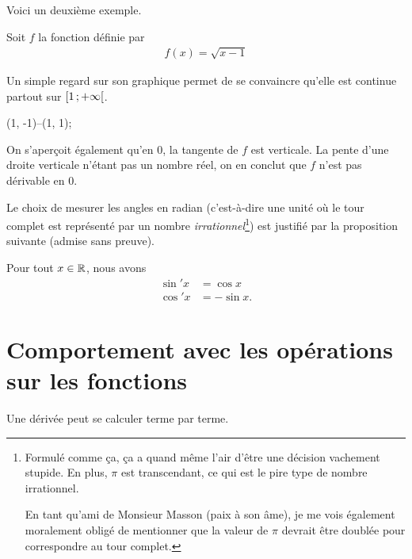 \documentclass[main.tex]{subfiles}
\begin{document}
Voici un deuxième exemple.

\begin{example}
    
    Soit $f$ la fonction définie par 
    \begin{align}
        f(x) = \sqrt {x-1}
    \end{align}
    
    Un simple regard sur son graphique permet de se convaincre qu'elle est continue partout sur $\mathopen{[}1\,;+ \infty\mathclose{[}$.
    \begin{plot}{0.5}{-2}{-2}{6}{4}
        \drawline (1, -1)--(1, 1);
    \end{plot}
    
    On s'aperçoit également qu'en $0$, la tangente de $f$ est verticale.
    La pente d'une droite verticale n'étant pas un nombre réel, on en conclut que $f$ n'est pas dérivable en $0$.
\end{example}

Le choix de mesurer les angles en radian
(c'est-à-dire une unité où le tour complet est représenté par un nombre \emph{irrationnel}\footnote{%
    Formulé comme ça, ça a quand même l'air d'être une décision vachement stupide.
    En plus, $\pi$ est transcendant, ce qui est le pire type de nombre irrationnel.

    En tant qu'ami de Monsieur Masson (paix à son âme),
    je me vois également moralement obligé de mentionner
    que la valeur de $\pi$ devrait être doublée pour correspondre au tour complet.
})
est justifié par la proposition suivante (admise sans preuve).

\begin{proposition}

    Pour tout $x \in \mathbb{R}$,
    nous avons
    \begin{align}
        \sin' x &= \cos x\\
        \cos' x &= -\sin x.
    \end{align}
\end{proposition}

\section{Comportement avec les opérations sur les fonctions}

Une dérivée peut se calculer terme par terme.
\end{document}
